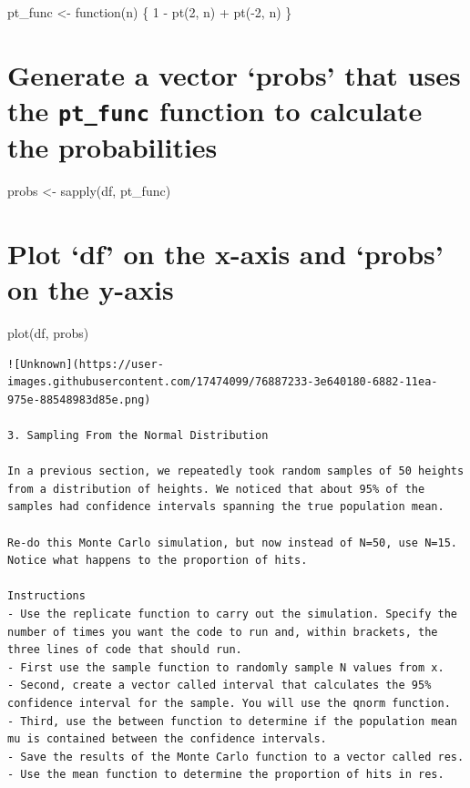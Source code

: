 \documentclass[
]{article}
\begin{document}
pt\_func \textless- function(n) \{ 1 - pt(2, n) + pt(-2, n) \}

\hypertarget{generate-a-vector-probs-that-uses-the-pt_func-function-to-calculate-the-probabilities}{%
\section{\texorpdfstring{Generate a vector `probs' that uses the
\texttt{pt\_func} function to calculate the
probabilities}{Generate a vector `probs' that uses the pt\_func function to calculate the probabilities}}\label{generate-a-vector-probs-that-uses-the-pt_func-function-to-calculate-the-probabilities}}

probs \textless- sapply(df, pt\_func)

\hypertarget{plot-df-on-the-x-axis-and-probs-on-the-y-axis}{%
\section{Plot `df' on the x-axis and `probs' on the
y-axis}\label{plot-df-on-the-x-axis-and-probs-on-the-y-axis}}

plot(df, probs)

\begin{verbatim}
![Unknown](https://user-images.githubusercontent.com/17474099/76887233-3e640180-6882-11ea-975e-88548983d85e.png)

3. Sampling From the Normal Distribution

In a previous section, we repeatedly took random samples of 50 heights from a distribution of heights. We noticed that about 95% of the samples had confidence intervals spanning the true population mean.

Re-do this Monte Carlo simulation, but now instead of N=50, use N=15. Notice what happens to the proportion of hits.

Instructions
- Use the replicate function to carry out the simulation. Specify the number of times you want the code to run and, within brackets, the three lines of code that should run.
- First use the sample function to randomly sample N values from x.
- Second, create a vector called interval that calculates the 95% confidence interval for the sample. You will use the qnorm function.
- Third, use the between function to determine if the population mean mu is contained between the confidence intervals.
- Save the results of the Monte Carlo function to a vector called res.
- Use the mean function to determine the proportion of hits in res.
\end{verbatim}
\end{document}
